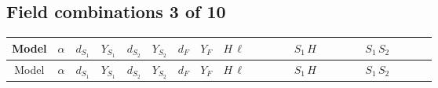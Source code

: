 \documentclass[8pt]{article}
\begin{document}
\begin{landscape}
\begin{longtable}{@{}cccccccc >{\raggedright\arraybackslash}p{0.21\linewidth} >{\raggedright\arraybackslash}p{0.21\linewidth} >{\raggedright\arraybackslash}p{0.21\linewidth}@{}}
\midrule
\bottomrule
\end{longtable}
\clearpage
\subsection*{Field combinations 3 of 10}
\begin{longtable}{@{}cccccccc >{\raggedright\arraybackslash}p{0.21\linewidth} >{\raggedright\arraybackslash}p{0.21\linewidth} >{\raggedright\arraybackslash}p{0.21\linewidth}@{}}
\toprule
Model & $\alpha$ & $d_{S_1}$ & $Y_{S_1}$ & $d_{S_2}$ & $Y_{S_2}$ & $d_F$ & $Y_F$ & $H\,\ell$ & $S_1\,H$ & $S_1\,S_2$ \\
\midrule
\endfirsthead
\toprule
Model & $\alpha$ & $d_{S_1}$ & $Y_{S_1}$ & $d_{S_2}$ & $Y_{S_2}$ & $d_F$ & $Y_F$ & $H\,\ell$ & $S_1\,H$ & $S_1\,S_2$ \\
\midrule
\endhead

\end{longtable}
\end{landscape}
\end{document}
